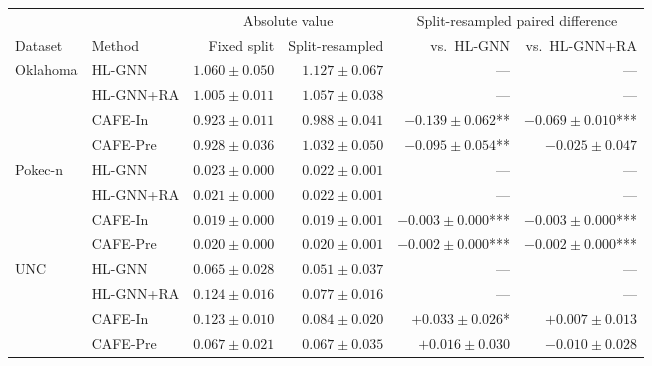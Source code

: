 \begin{tabular}{llrrrr}
\toprule
 & & \multicolumn{2}{c}{Absolute value} & \multicolumn{2}{c}{Split-resampled paired difference} \\
\cmidrule(lr){3-4}\cmidrule(lr){5-6}
Dataset & Method & Fixed split & Split-resampled & vs.\ HL-GNN & vs.\ HL-GNN+RA \\
\midrule
Oklahoma & HL-GNN & $1.060 \pm 0.050$ & $1.127 \pm 0.067$ & --- & --- \\
 & HL-GNN+RA & $1.005 \pm 0.011$ & $1.057 \pm 0.038$ & --- & --- \\
 & CAFE-In & $0.923 \pm 0.011$ & $0.988 \pm 0.041$ & $-0.139 \pm 0.062$** & $-0.069 \pm 0.010$*** \\
 & CAFE-Pre & $0.928 \pm 0.036$ & $1.032 \pm 0.050$ & $-0.095 \pm 0.054$** & $-0.025 \pm 0.047$ \\
\addlinespace[2pt]
Pokec-n & HL-GNN & $0.023 \pm 0.000$ & $0.022 \pm 0.001$ & --- & --- \\
 & HL-GNN+RA & $0.021 \pm 0.000$ & $0.022 \pm 0.001$ & --- & --- \\
 & CAFE-In & $0.019 \pm 0.000$ & $0.019 \pm 0.001$ & $-0.003 \pm 0.000$*** & $-0.003 \pm 0.000$*** \\
 & CAFE-Pre & $0.020 \pm 0.000$ & $0.020 \pm 0.001$ & $-0.002 \pm 0.000$*** & $-0.002 \pm 0.000$*** \\
\addlinespace[2pt]
UNC & HL-GNN & $0.065 \pm 0.028$ & $0.051 \pm 0.037$ & --- & --- \\
 & HL-GNN+RA & $0.124 \pm 0.016$ & $0.077 \pm 0.016$ & --- & --- \\
 & CAFE-In & $0.123 \pm 0.010$ & $0.084 \pm 0.020$ & $+0.033 \pm 0.026$* & $+0.007 \pm 0.013$ \\
 & CAFE-Pre & $0.067 \pm 0.021$ & $0.067 \pm 0.035$ & $+0.016 \pm 0.030$ & $-0.010 \pm 0.028$ \\
\bottomrule
\end{tabular}
\vspace{6pt}

